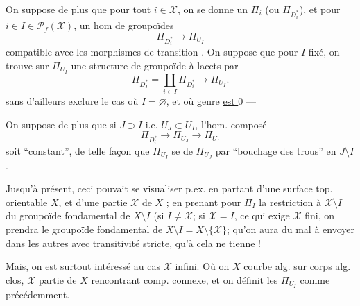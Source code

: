 On suppose de plus que pour tout 
$i\in\mathcal{X}$, on se donne un 
$\Pi_i$ (ou $\Pi_{D_i^*}$),
et  pour $i\in I\in\mathcal{P}_f(\mathcal{X})$,
un hom de groupoïdes
\[
\Pi_{D_i^*}\to\Pi_{U_I}
\]
compatible avec les morphismes de transition
.
On suppose que pour $I$ fixé, on trouve
sur $\Pi_{U_I}$ une structure de groupoïde
à lacets par
\[
\Pi_{D_I^*}=\coprod_{i\in I}\Pi_{D_i^*}\to\Pi_{U_I}.
\]
sans d'ailleurs exclure le cas où $I=\varnothing$, et où   genre \uline{est $0$} --- 

On suppose de plus que si $J\supset I$ i.e. $U_J\subset U_I$,  l'hom. composé
\[
\Pi_{D_i^*}\longrightarrow\Pi_{U_J}\longrightarrow\Pi_{U_I}
\]
soit ``constant'', de telle façon que $\Pi_{U_I}$ se  de $\Pi_{U_J}$ par ``bouchage des trous'' en $J\setminus I$.

Jusqu'à présent,  ceci pouvait se visualiser p.ex. en partant d'une surface top. orientable  $X$, et d'une partie  $\mathcal{X}$ de $X$  ; en prenant pour $\Pi_I$ la restriction à $\mathcal{X}\setminus I$ du groupoïde fondamental de $X\setminus I$ (si $I\ne\mathcal{X}$; si $\mathcal{X}=I$, ce qui exige $\mathcal{X}$ fini, on prendra le groupoïde fondamental de $X\setminus I=X\setminus\{\mathcal{X}\}$; qu'on aura du mal à envoyer dans les autres avec transitivité \uline{stricte}, qu'à cela ne tienne !

Mais, on est surtout intéressé au cas $\mathcal{X}$ infini. Où on  $X$ courbe alg. sur
corps alg. clos, $\mathcal{X}$ partie de $X$ rencontrant  comp. connexe, et on définit les $\Pi_{U_I}$ comme précédemment.

